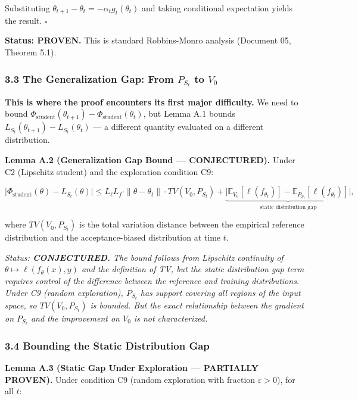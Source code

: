 \documentclass[
  12pt,
]{article}
\begin{document}
Substituting \(\theta_{t+1} - \theta_t = -\alpha_t g_t(\theta_t)\) and
taking conditional expectation yields the result. \(\square\)

\textbf{Status: PROVEN.} This is standard Robbins-Monro analysis
(Document 05, Theorem 5.1).

\subsubsection{\texorpdfstring{3.3 The Generalization Gap: From
\(P_{S_t}\) to
\(V_0\)}{3.3 The Generalization Gap: From P\_\{S\_t\} to V\_0}}\label{the-generalization-gap-from-p_s_t-to-v_0}

\textbf{This is where the proof encounters its first major difficulty.}
We need to bound
\(\Phi_{\text{student}}(\theta_{t+1}) - \Phi_{\text{student}}(\theta_t)\),
but Lemma A.1 bounds \(L_{S_t}(\theta_{t+1}) - L_{S_t}(\theta_t)\) --- a
different quantity evaluated on a different distribution.

\textbf{Lemma A.2 (Generalization Gap Bound --- CONJECTURED).} Under C2
(Lipschitz student) and the exploration condition C9:

\[\bigl|\Phi_{\text{student}}(\theta) - L_{S_t}(\theta)\bigr| \leq L_\ell L_f \cdot \|\theta - \theta_t\| \cdot TV(V_0, P_{S_t}) + \underbrace{\bigl|\mathbb{E}_{V_0}[\ell(f_{\theta_t})] - \mathbb{E}_{P_{S_t}}[\ell(f_{\theta_t})]\bigr|}_{\text{static distribution gap}},\]

where \(TV(V_0, P_{S_t})\) is the total variation distance between the
empirical reference distribution and the acceptance-biased distribution
at time \(t\).

\emph{Status: \textbf{CONJECTURED.} The bound follows from Lipschitz
continuity of \(\theta \mapsto \ell(f_\theta(x), y)\) and the definition
of TV, but the static distribution gap term requires control of the
difference between the reference and training distributions. Under C9
(random exploration), \(P_{S_t}\) has support covering all regions of
the input space, so \(TV(V_0, P_{S_t})\) is bounded. But the exact
relationship between the gradient on \(P_{S_t}\) and the improvement on
\(V_0\) is not characterized.}

\subsubsection{3.4 Bounding the Static Distribution
Gap}\label{bounding-the-static-distribution-gap}

\textbf{Lemma A.3 (Static Gap Under Exploration --- PARTIALLY PROVEN).}
Under condition C9 (random exploration with fraction
\(\varepsilon > 0\)), for all \(t\):
\end{document}
